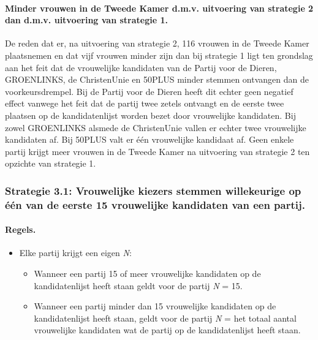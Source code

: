 \paragraph{Minder vrouwen in de Tweede Kamer d.m.v. uitvoering van strategie 2 dan d.m.v. uitvoering van strategie 1.}
De reden dat er, na uitvoering van strategie 2, 116 vrouwen in de Tweede Kamer plaatsnemen en dat vijf vrouwen minder zijn dan bij strategie 1 ligt ten grondslag aan het feit dat de vrouwelijke kandidaten van de Partij voor de Dieren, GROENLINKS, de ChristenUnie en 50PLUS minder stemmen ontvangen dan de voorkeursdrempel. Bij de Partij voor de Dieren heeft dit echter geen negatief effect vanwege het feit dat de partij twee zetels ontvangt en de eerste twee plaatsen op de kandidatenlijst worden bezet door vrouwelijke kandidaten. Bij zowel GROENLINKS alsmede de ChristenUnie vallen er echter twee vrouwelijke kandidaten af. Bij 50PLUS valt er één vrouwelijke kandidaat af. Geen enkele partij krijgt meer vrouwen in de Tweede Kamer na uitvoering van strategie 2 ten opzichte van strategie 1.   


\subsubsection{Strategie 3.1: Vrouwelijke kiezers stemmen willekeurige op één van de eerste 15 vrouwelijke kandidaten van een partij.}

\paragraph{Regels.}
\begin{itemize}
\item
Elke partij krijgt een eigen \textit{N}:
	\begin{itemize}
		\item
Wanneer een partij 15 of meer vrouwelijke kandidaten op de kandidatenlijst heeft staan geldt voor de partij 	\textit{N} = 15.
		\item
Wanneer een partij minder dan 15 vrouwelijke kandidaten op de kandidatenlijst heeft staan, geldt voor de partij \textit{N} = het totaal aantal vrouwelijke kandidaten wat de partij op de kandidatenlijst heeft staan.\\
	\end{itemize}
\end{itemize}

